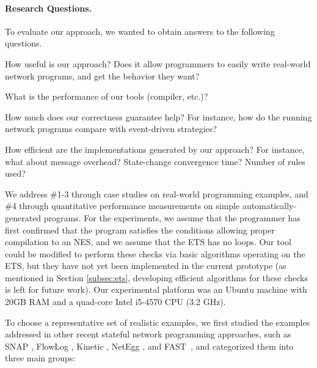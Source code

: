 \documentclass[pldi-cameraready]{sigplanconf}
\newcommand*\xmnote[3][0pt]{}
\begin{document}
\paragraph{Research Questions.} To evaluate our approach, we wanted to obtain answers to the following questions.
\begin{compactenum}
\item How useful is our approach? Does it allow programmers to easily write
real-world network programs, and get the behavior they want?
\item What is the performance of our tools (compiler, etc.)?
\item How much does our correctness guarantee help? For instance, how do the
running network programs compare with  event-driven strategies?
\item How efficient are the implementations generated by our approach? For
instance, what about message overhead? State-change convergence time? Number of rules used?
\end{compactenum}

\noindent
We address \#1-3 through case studies on
real-world programming examples, and \#4 through quantitative performance measurements on simple
automatically-generated programs.
For the experiments, we assume that the programmer has first confirmed that the
program satisfies the conditions allowing proper compilation to an NES,
and we assume that the ETS has no loops.
Our tool could be modified to perform these checks
\xmnote{\FiveStar}{Q15}via basic algorithms operating on the ETS, but they
have not yet been implemented in the current prototype
(as mentioned in Section \ref{subsec:ets}, developing efficient algorithms
for these checks is left for future work).
Our experimental platform was an Ubuntu machine with 20GB
RAM and a quad-core Intel i5-4570 CPU (3.2 GHz).

To choose a representative set of realistic examples,
\xmnote{\FiveStar}{Q16}we first studied the examples addressed in other recent stateful network
programming approaches, such as
SNAP \cite{arashloo2015snap},
FlowLog \cite{nelson2014tierless},
Kinetic \cite{kim2015kinetic},
NetEgg \cite{yuan2015netegg}, and
FAST~\cite{moshref2014flow}, and
categorized them into three main groups:
\end{document}
